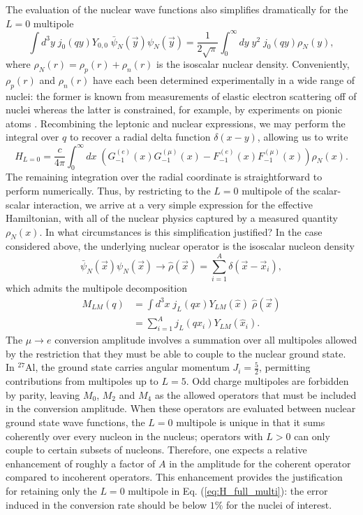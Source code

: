 \documentclass{book}[letterpaper,12pt]
\begin{document}
The evaluation of the nuclear wave functions also simplifies dramatically for the $L=0$ multipole
\begin{equation}
\int d^3y\;j_0(qy)Y_{0,0}\;\bar{\psi}_N(\vec{y})\psi_N(\vec{y})=\frac{1}{2\sqrt{\pi}}\int_0^{\infty}dy\;y^2\;j_0(qy)\rho_N(y),
\end{equation}
where $\rho_N(r)=\rho_p(r)+\rho_n(r)$ is the isoscalar nuclear density. Conveniently, $\rho_p(r)$ and $\rho_n(r)$ have each been determined experimentally in a wide range of nuclei: the former is known from measurements of elastic electron scattering off of nuclei \cite{DEVRIES1987495} whereas the latter is constrained, for example, by experiments on pionic atoms \cite{Garcia-Recio:1991ocp}. Recombining the leptonic and nuclear expressions, we may perform the integral over $q$ to recover a radial delta function $\delta(x-y)$, allowing us to write
\begin{equation}
H_{L=0}=\frac{c}{4\pi}\int_0^{\infty}dx\;\left(G_{-1}^{(e)}(x)G_{-1}^{(\mu)}(x)-F_{-1}^{(e)}(x)F_{-1}^{(\mu)}(x)\right)\rho_N(x).
\label{eq:H_coherent}
\end{equation}
The remaining integration over the radial coordinate is straightforward to perform numerically. Thus, by restricting to the $L=0$ multipole of the scalar-scalar interaction, we arrive at a very simple expression for the effective Hamiltonian, with all of the nuclear physics captured by a measured quantity $\rho_N(x)$. In what circumstances is this simplification justified? In the case considered above, the underlying nuclear operator is the isoscalar nucleon density
\begin{equation}
\bar{\psi}_N(\vec{x})\psi_N(\vec{x})\rightarrow\hat{\rho}(\vec{x})=\sum_{i=1}^A\delta(\vec{x}-\vec{x}_i),
\end{equation} 
which admits the multipole decomposition
\begin{equation}
\begin{split}
M_{LM}(q)&=\int d^3x\;j_L(qx)Y_{LM}(\hat{x})\;\hat{\rho}(\vec{x})\\
&=\sum_{i=1}^Aj_L(qx_i)Y_{LM}(\hat{x}_i).
\end{split}
\end{equation}
The $\mu\rightarrow e$ conversion amplitude involves a summation over all multipoles allowed by the restriction that they must be able to couple to the nuclear ground state. In $^{27}$Al, the ground state carries angular momentum $J_i=\frac{5}{2}$, permitting contributions from multipoles up to $L=5$. Odd charge multipoles are forbidden by parity, leaving $M_0$, $M_2$ and $M_4$ as the allowed operators that must be included in the conversion amplitude. When these operators are evaluated between nuclear ground state wave functions, the $L=0$ multipole is unique in that it sums coherently over every nucleon in the nucleus; operators with $L>0$ can only couple to certain subsets of nucleons. Therefore, one expects a relative enhancement of roughly a factor of $A$ in the amplitude for the coherent operator compared to incoherent operators. This enhancement provides the justification for retaining only the $L=0$ multipole in Eq. (\ref{eq:H_full_multi}): the error induced in the conversion rate should be below $1\%$ for the nuclei of interest. 
\end{document}
